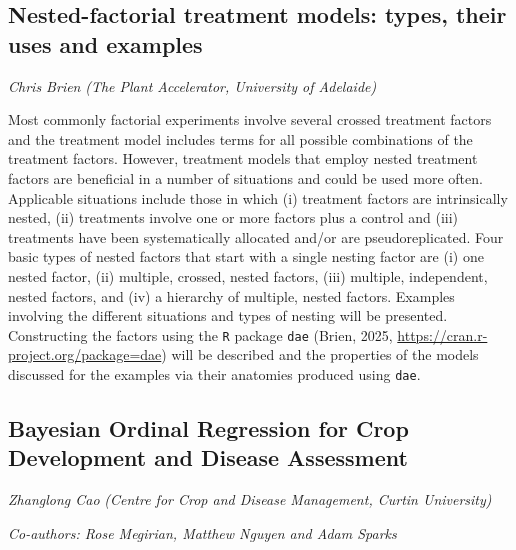 \documentclass[
]{scrreprt}
\begin{document}
\subsection{Nested-factorial treatment models: types, their uses and
examples}\label{nested-factorial-treatment-models-types-their-uses-and-examples}

\emph{Chris Brien} \emph{(The Plant Accelerator,
University of Adelaide)}

\setlength{\parskip}{0.5em}

Most commonly factorial experiments involve several crossed treatment
factors and the treatment model includes terms for all possible
combinations of the treatment factors. However, treatment models that
employ nested treatment factors are beneficial in a number of situations
and could be used more often. Applicable situations include those in
which (i) treatment factors are intrinsically nested, (ii) treatments
involve one or more factors plus a control and (iii) treatments have
been systematically allocated and/or are pseudoreplicated. Four basic
types of nested factors that start with a single nesting factor are (i)
one nested factor, (ii) multiple, crossed, nested factors, (iii)
multiple, independent, nested factors, and (iv) a hierarchy of multiple,
nested factors. Examples involving the different situations and types of
nesting will be presented. Constructing the factors using the \texttt{R}
package \texttt{dae} (Brien, 2025,
\url{https://cran.r-project.org/package=dae}) will be described and the
properties of the models discussed for the examples via their anatomies
produced using \texttt{dae}.

\subsection{Bayesian Ordinal Regression for Crop Development and Disease
Assessment}\label{bayesian-ordinal-regression-for-crop-development-and-disease-assessment}

\emph{Zhanglong Cao} \emph{(Centre for Crop and
Disease Management, Curtin University)}

\emph{Co-authors: Rose Megirian, Matthew Nguyen and Adam Sparks}

\setlength{\parskip}{0.5em}
\end{document}
